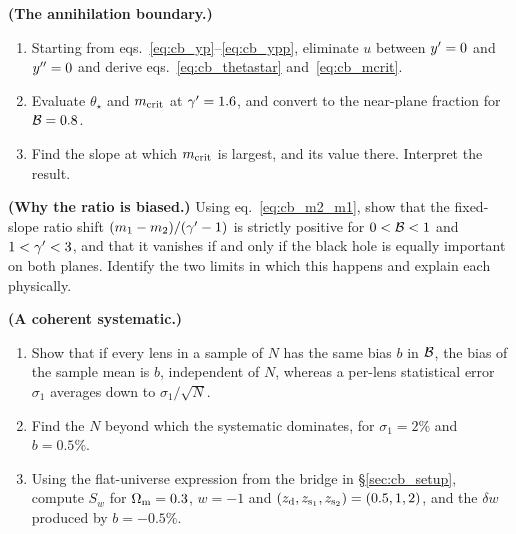 \begin{exercise}
\label{ex:cb_annihilation}
\textbf{(The annihilation boundary.)}
\begin{enumerate}[label=(\alph*)]
  \item Starting from eqs.~\eqref{eq:cb_yp}--\eqref{eq:cb_ypp}, eliminate
        $u$ between $y'=0$ and $y''=0$ and derive
        eqs.~\eqref{eq:cb_thetastar} and~\eqref{eq:cb_mcrit}.
  \item Evaluate $\theta_\star$ and $m_{\rm crit}$ at $\gamma'=1.6$, and
        convert to the near-plane fraction for $\mathcal{B}=0.8$.
  \item Find the slope at which $m_{\rm crit}$ is largest, and its
        value there. Interpret the result.
\end{enumerate}
\end{exercise}

\begin{exercise}
\label{ex:cb_differential}
\textbf{(Why the ratio is biased.)}
Using eq.~\eqref{eq:cb_m2_m1}, show that the fixed-slope ratio shift
$(m_1-m_2)/(\gamma'-1)$ is strictly positive for $0<\mathcal{B}<1$ and
$1<\gamma'<3$, and that it vanishes if and only if the black hole is equally
important on both planes. Identify the two limits in which this happens
and explain each physically.
\end{exercise}

\begin{exercise}
\label{ex:cb_coherent}
\textbf{(A coherent systematic.)}
\begin{enumerate}[label=(\alph*)]
  \item Show that if every lens in a sample of $N$ has the same bias $b$
        in $\mathcal{B}$, the bias of the sample mean is $b$, independent of
        $N$, whereas a per-lens statistical error $\sigma_1$ averages
        down to $\sigma_1/\sqrt{N}$.
  \item Find the $N$ beyond which the systematic dominates, for
        $\sigma_1=2\%$ and $b=0.5\%$.
  \item Using the flat-universe expression from the bridge in
        \S\ref{sec:cb_setup}, compute $S_w$ for $\Omega_{\mathrm{m}}=0.3$, $w=-1$ and
        $(z_{\rm d},z_{\rm s_1},z_{\rm s_2})=(0.5,1,2)$, and the
        $\delta w$ produced by $b=-0.5\%$.
\end{enumerate}
\end{exercise}

